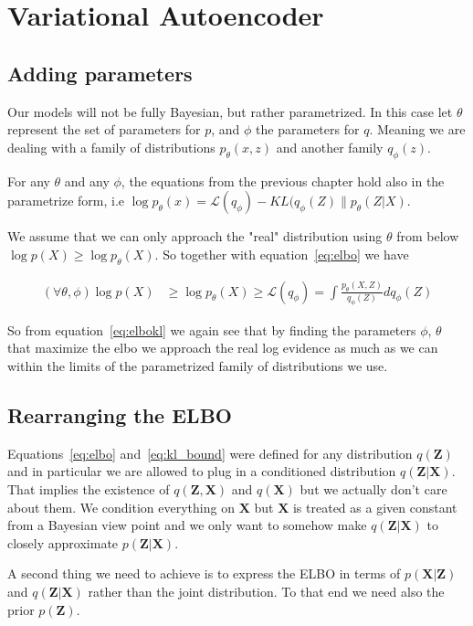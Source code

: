 \documentclass[11pt, a4paper]{report}
\theoremstyle{plain}
\theoremstyle{definition}
\theoremstyle{remark}
\newcommand{\X}{\mathbf{X}}
\newcommand{\Z}{\mathbf{Z}}
\begin{document}
\section{Variational Autoencoder}
\subsection{Adding parameters}

Our models will not be fully Bayesian, but rather parametrized.
In this case let $\theta$ represent the set of parameters for $p$, and $\phi$
the parameters for $q$. Meaning we are dealing with a family of distributions
$p_{\theta}(x,z)$ and another family $q_{\phi}(z)$.

For any $\theta$ and any $\phi$, the equations from the previous chapter hold
also in the parametrize form, i.e $\log p_{\theta}(x) = \mathcal{L}(q_{\phi}) -
KL(q_{\phi}(Z) \| p_{\theta}(Z|X)$.

We assume that we can only approach the "real" distribution using
$\theta$ from below $\log p(X) \geq \log p_{\theta}(X)$.
So together with equation~\ref{eq:elbo} we have

\begin{equation}\label{eq:parelbo}
\begin{aligned}
(\forall \theta, \phi)\log p(X) & \geq \log p_{\theta}(X) \geq \mathcal{L}(q_{\phi})
= \int \frac{p_{\theta}(X,Z)}{q_{\phi}(Z)} dq_{\phi}(Z)
\end{aligned}
\end{equation}

So from equation~\ref{eq:elbokl} we again see that by finding the parameters
$\phi$, $\theta$ that maximize the elbo we approach the real log evidence as much
as we can within the limits of the parametrized family of distributions we use.

\subsection{Rearranging the ELBO}
Equations~\ref{eq:elbo} and~\ref{eq:kl_bound} were defined for any distribution
$q(\Z)$ and in particular we are allowed to plug in a conditioned
distribution $q(\Z|\X)$. That implies the existence of $q(\Z,\X)$ and $q(\X)$
but we actually don't care about them. We condition everything on $\X$ but $\X$
is treated as a given constant from a Bayesian view point and we only want to
somehow make $q(\Z|\X)$ to closely approximate $p(\Z | \X)$.

A second thing we need to achieve is to express the ELBO in terms of $p(\X|\Z)$
and $q(\Z|\X)$ rather than the joint distribution. To that end we need also the
prior $p(\Z)$.
\end{document}
